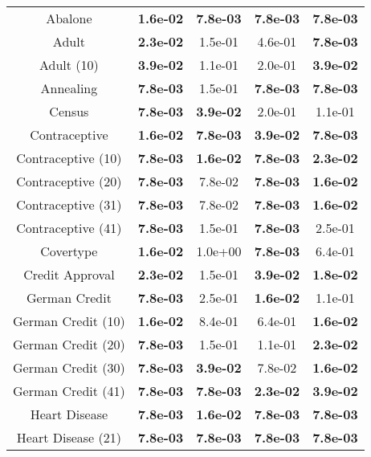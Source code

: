 \begin{longtable}{ccccc}
\bottomrule
\endlastfoot
           Abalone & \textbf{{1.6e-02}} & \textbf{{7.8e-03}} & \textbf{{7.8e-03}} & \textbf{{7.8e-03}} \\
             Adult & \textbf{{2.3e-02}} &          {1.5e-01} &          {4.6e-01} & \textbf{{7.8e-03}} \\
        Adult (10) & \textbf{{3.9e-02}} &          {1.1e-01} &          {2.0e-01} & \textbf{{3.9e-02}} \\
         Annealing & \textbf{{7.8e-03}} &          {1.5e-01} & \textbf{{7.8e-03}} & \textbf{{7.8e-03}} \\
            Census & \textbf{{7.8e-03}} & \textbf{{3.9e-02}} &          {2.0e-01} &          {1.1e-01} \\
     Contraceptive & \textbf{{1.6e-02}} & \textbf{{7.8e-03}} & \textbf{{3.9e-02}} & \textbf{{7.8e-03}} \\
Contraceptive (10) & \textbf{{7.8e-03}} & \textbf{{1.6e-02}} & \textbf{{7.8e-03}} & \textbf{{2.3e-02}} \\
Contraceptive (20) & \textbf{{7.8e-03}} &          {7.8e-02} & \textbf{{7.8e-03}} & \textbf{{1.6e-02}} \\
Contraceptive (31) & \textbf{{7.8e-03}} &          {7.8e-02} & \textbf{{7.8e-03}} & \textbf{{1.6e-02}} \\
Contraceptive (41) & \textbf{{7.8e-03}} &          {1.5e-01} & \textbf{{7.8e-03}} &          {2.5e-01} \\
         Covertype & \textbf{{1.6e-02}} &          {1.0e+00} & \textbf{{7.8e-03}} &          {6.4e-01} \\
   Credit Approval & \textbf{{2.3e-02}} &          {1.5e-01} & \textbf{{3.9e-02}} & \textbf{{1.8e-02}} \\
     German Credit & \textbf{{7.8e-03}} &          {2.5e-01} & \textbf{{1.6e-02}} &          {1.1e-01} \\
German Credit (10) & \textbf{{1.6e-02}} &          {8.4e-01} &          {6.4e-01} & \textbf{{1.6e-02}} \\
German Credit (20) & \textbf{{7.8e-03}} &          {1.5e-01} &          {1.1e-01} & \textbf{{2.3e-02}} \\
German Credit (30) & \textbf{{7.8e-03}} & \textbf{{3.9e-02}} &          {7.8e-02} & \textbf{{1.6e-02}} \\
German Credit (41) & \textbf{{7.8e-03}} & \textbf{{7.8e-03}} & \textbf{{2.3e-02}} & \textbf{{3.9e-02}} \\
     Heart Disease & \textbf{{7.8e-03}} & \textbf{{1.6e-02}} & \textbf{{7.8e-03}} & \textbf{{7.8e-03}} \\
Heart Disease (21) & \textbf{{7.8e-03}} & \textbf{{7.8e-03}} & \textbf{{7.8e-03}} & \textbf{{7.8e-03}} \\
\end{longtable}

